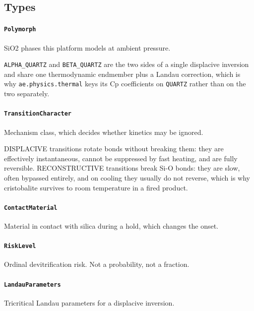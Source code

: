 \documentclass[10pt,a4paper,twoside]{report}
\begin{document}
\subsection*{Types}

\paragraph{\texttt{Polymorph}}

SiO2 phases this platform models at ambient pressure.

\texttt{ALPHA\_QUARTZ} and \texttt{BETA\_QUARTZ} are the two sides of a single displacive inversion and share one thermodynamic endmember plus a Landau correction, which is why \texttt{ae.physics.thermal} keys its Cp coefficients on \texttt{QUARTZ} rather than on the two separately.

\paragraph{\texttt{TransitionCharacter}}

Mechanism class, which decides whether kinetics may be ignored.

DISPLACIVE transitions rotate bonds without breaking them: they are effectively instantaneous, cannot be suppressed by fast heating, and are fully reversible. RECONSTRUCTIVE transitions break Si-O bonds: they are slow, often bypassed entirely, and on cooling they usually do not reverse, which is why cristobalite survives to room temperature in a fired product.

\paragraph{\texttt{ContactMaterial}}

Material in contact with silica during a hold, which changes the onset.

\paragraph{\texttt{RiskLevel}}

Ordinal devitrification risk. Not a probability, not a fraction.

\paragraph{\texttt{LandauParameters}}

Tricritical Landau parameters for a displacive inversion.
\end{document}
